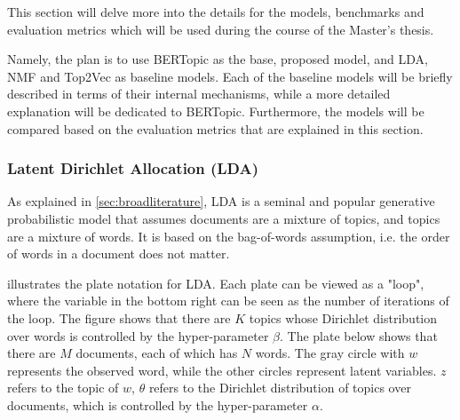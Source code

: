 \documentclass{article}
\begin{document}
This section will delve more into the details for the models, benchmarks and evaluation metrics which will be used during the course of the Master's thesis.

Namely, the plan is to use BERTopic as the base, proposed model, and LDA, NMF and Top2Vec as baseline models. Each of the baseline models will be briefly described in terms of their internal mechanisms, while a more detailed explanation will be dedicated to BERTopic. Furthermore, the models will be compared based on the evaluation metrics that are explained in this section.

\subsubsection{Latent Dirichlet Allocation (LDA)}
As explained in \cref{sec:broadliterature}, LDA \cite{blei_latent_2001} is a seminal and popular generative probabilistic model that assumes documents are a mixture of topics, and topics are a mixture of words. It is based on the bag-of-words assumption, i.e. the order of words in a document does not matter.

 illustrates the plate notation for LDA. Each plate can be viewed as a "loop", where the variable in the bottom right can be seen as the number of iterations of the loop. The figure shows that there are $K$ topics whose Dirichlet distribution over words is controlled by the hyper-parameter $\beta$. The plate below shows that there are $M$ documents, each of which has $N$ words. The gray circle with $w$ represents the observed word, while the other circles represent latent variables. $z$ refers to the topic of $w$, $\theta$ refers to the Dirichlet distribution of topics over documents, which is controlled by the hyper-parameter $\alpha$.
\end{document}
